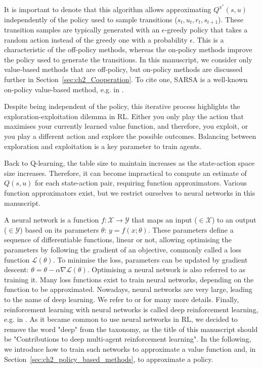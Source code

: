 It is important to denote that this algorithm allows approximating $Q^{\pi^*}(s, u)$ independently of the policy used to sample transitions ($s_t, u_t, r_t, s_{t+1}$).
These transition samples are typically generated with an $\epsilon$-greedy policy that takes a random action instead of the greedy one with a probability $\epsilon$.
This is a characteristic of the off-policy methods, whereas the on-policy methods improve the policy used to generate the transitions.
In this manuscript, we consider only value-based methods that are off-policy, but on-policy methods are discussed further in Section~\ref{sec:ch2_Cooperation}.
To cite one, SARSA is a well-known on-policy value-based method, e.g. in \citep{sutton2018reinforcement}.

Despite being independent of the policy, this iterative process highlights the exploration-exploitation dilemma in RL.
Either you only play the action that maximises your currently learned value function, and therefore, you exploit, or you play a different action and explore the possible outcomes.
Balancing between exploration and exploitation is a key parameter to train agents.

Back to Q-learning, the table size to maintain increases as the state-action space size increases.
Therefore, it can become impractical to compute an estimate of $Q(s, u)$ for each state-action pair, requiring function approximators.
Various function approximators exist, but we restrict ourselves to neural networks in this manuscript.

A neural network is a function $f: \mathcal{X} \rightarrow \mathcal{Y}$ that maps an input ($\in\mathcal{X}$) to an output ($\in\mathcal{Y}$) based on its parameters $\theta$: $y = f(x;\theta)$.
These parameters define a sequence of differentiable functions, linear or not, allowing optimising the parameters by following the gradient of an objective, commonly called a loss function $\mathcal{L}(\theta)$.
To minimise the loss, parameters can be updated by gradient descent: $\theta = \theta - \alpha \nabla \mathcal{L}(\theta)$.
Optimising a neural network is also referred to as training it.
Many loss functions exist to train neural networks, depending on the function to be approximated.
Nowadays, neural networks are very large, leading to the name of deep learning.
We refer to \citep{zhang2023dive} or \citep{prince2023understanding} for many more details.
Finally, reinforcement learning with neural networks is called deep reinforcement learning, e.g. in \citep{introDeepRL}.
As it became common to use neural networks in RL, we decided to remove the word "deep" from the taxonomy, as the title of this manuscript should be "Contributions to deep multi-agent reinforcement learning".
In the following, we introduce how to train such networks to approximate a value function and, in Section~\ref{sec:ch2_policy_based_methods}, to approximate a policy.

